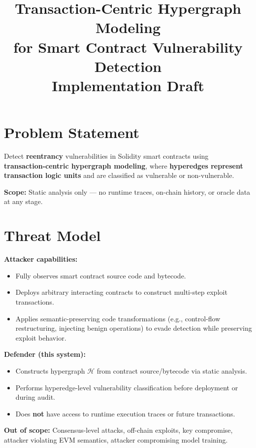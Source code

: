 \documentclass[11pt]{article}
\title{\textbf{Transaction-Centric Hypergraph Modeling}\\
\large for Smart Contract Vulnerability Detection\\[0.5em]
\normalsize Implementation Draft}
\date{}
\begin{document}
\maketitle
\tableofcontents
\newpage

\section{Problem Statement}

Detect \textbf{reentrancy} vulnerabilities in Solidity smart contracts using \textbf{transaction-centric hypergraph modeling}, where \textbf{hyperedges represent transaction logic units} and are classified as vulnerable or non-vulnerable.

\textbf{Scope:} Static analysis only --- no runtime traces, on-chain history, or oracle data at any stage.

\section{Threat Model}

\textbf{Attacker capabilities:}
\begin{itemize}
    \item Fully observes smart contract source code and bytecode.
    \item Deploys arbitrary interacting contracts to construct multi-step exploit transactions.
    \item Applies semantic-preserving code transformations (e.g., control-flow restructuring, injecting benign operations) to evade detection while preserving exploit behavior.
\end{itemize}

\textbf{Defender (this system):}
\begin{itemize}
    \item Constructs hypergraph $\mathcal{H}$ from contract source/bytecode via static analysis.
    \item Performs hyperedge-level vulnerability classification before deployment or during audit.
    \item Does \textbf{not} have access to runtime execution traces or future transactions.
\end{itemize}

\textbf{Out of scope:} Consensus-level attacks, off-chain exploits, key compromise, attacker violating EVM semantics, attacker compromising model training.
\end{document}
